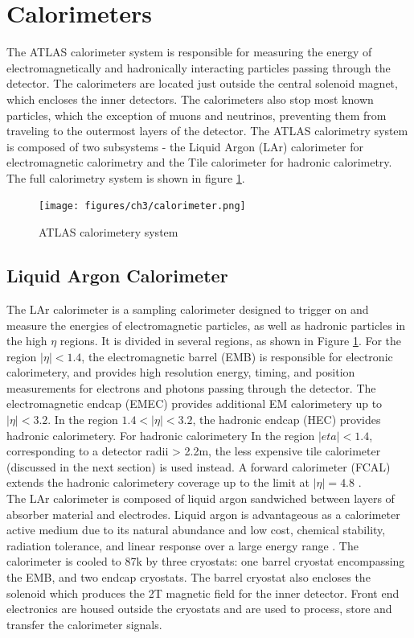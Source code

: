 \section{Calorimeters}
The ATLAS calorimeter system is responsible for measuring the energy of electromagnetically and hadronically interacting particles passing through the detector. The calorimeters are located just outside the central solenoid magnet, which encloses the inner detectors. The calorimeters also stop most known particles, which the exception of muons and neutrinos, preventing them from traveling to the outermost layers of the detector. The ATLAS calorimetry system is composed of two subsystems - the Liquid Argon (LAr) calorimeter for electromagnetic calorimetry and the Tile calorimeter for hadronic calorimetry. The full calorimetry system is shown in figure \ref{fig:calorimeters}.

\begin{figure}
        \centering
	\texttt{[image: figures/ch3/calorimeter.png]}
	\caption{ATLAS calorimetery system \cite{calorimeter_img}}
	\label{fig:calorimeters}
\end{figure}

\subsection{Liquid Argon Calorimeter}
The LAr calorimeter is a sampling calorimeter designed to trigger on and measure the energies of electromagnetic particles, as well as hadronic particles in the high $\eta$ regions. It is divided in several regions, as shown in Figure \ref{fig:calorimeters}. For the region $|\eta| < 1.4$, the electromagnetic barrel (EMB) is responsible for electronic calorimetery, and provides high resolution energy, timing, and position measurements for electrons and photons passing through the detector. The electromagnetic endcap (EMEC) provides additional EM calorimetery up to $|\eta|<3.2$. In the region $1.4 < |\eta| < 3.2$, the hadronic endcap (HEC) provides hadronic calorimetery. For hadronic calorimetery In the region $|eta| < 1.4$, corresponding to a detector radii > 2.2m, the less expensive tile calorimeter (discussed in the next section) is used instead. A forward calorimeter (FCAL) extends the hadronic calorimetery coverage up to the limit at $|\eta| = 4.8$ \cite{lar_tdr}. \\
 
The LAr calorimeter is composed of liquid argon sandwiched between layers of absorber material and electrodes. Liquid argon is advantageous as a calorimeter active medium due to its natural abundance and low cost, chemical stability, radiation tolerance, and linear response over a large energy range \cite{lar_ssc}. The calorimeter is cooled to 87k by three cryostats: one barrel cryostat encompassing the EMB, and two endcap cryostats. The barrel cryostat also encloses the solenoid which produces the 2T magnetic field for the inner detector. Front end electronics are housed outside the cryostats and are used to process, store and transfer the calorimeter signals. \\ 

